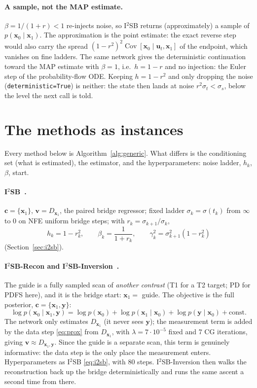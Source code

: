 \documentclass[11pt]{article}
\theoremstyle{remark}
\newcommand{\x}{\bm{x}}
\newcommand{\y}{\bm{y}}
\newcommand{\uu}{\bm{u}}
\newcommand{\vv}{\bm{v}}
\newcommand{\cc}{\bm{c}}
\newcommand{\code}[1]{\texttt{#1}}
\newcommand{\Dg}{D_{\x_1}}
\newcommand{\Dgy}{D_{\x_1,\y}}
\begin{document}
\paragraph{A sample, not the MAP estimate.} $\beta = 1/(1+r)<1$ re-injects noise, so I$^2$SB
returns (approximately) a sample of $p(\x_0\mid\x_1)$. The approximation is the point estimate:
the exact reverse step would also carry the spread
$(1-r^2)^2\operatorname{Cov}[\x_0\mid\uu_t,\x_1]$ of the endpoint, which vanishes on fine
ladders. The same network gives the deterministic continuation toward the MAP estimate with
$\beta = 1$, i.e.\ $h = 1-r$ and no injection: the Euler step of the probability-flow ODE.
Keeping $h = 1-r^2$ and only dropping the noise (\code{deterministic=True}) is neither: the
state then lands at noise $r^2\sigma_t < \sigma_s$, below the level the next call is told.

\section{The methods as instances}

Every method below is Algorithm~\ref{alg:generic}. What differs is the conditioning set (what
is estimated), the estimator, and the hyperparameters: noise ladder, $h_k$, $\beta$, start.

\paragraph{I$^2$SB~\cite{liu2023}.} $\cc = \{\x_1\}$, $\vv = \Dg$, the paired bridge regressor;
fixed ladder $\sigma_k = \sigma(t_k)$ from $\infty$ to $0$ on NFE uniform bridge steps; with
$r_k = \sigma_{k+1}/\sigma_k$,
\begin{equation}
  h_k = 1 - r_k^2,\qquad \beta_k = \frac{1}{1+r_k},\qquad \gamma_k^2 = \sigma_{k+1}^2(1-r_k^2)
  \label{eq:i2sb}
\end{equation}
(Section~\ref{sec:i2sb}).

\paragraph{I$^2$SB-Recon and I$^2$SB-Inversion~\cite{wang2024}.} The guide is a fully sampled
scan of \emph{another contrast} (T1 for a T2 target; PD for PDFS here), and it is the bridge
start: $\x_1 = $ guide. The objective is the full posterior, $\cc = \{\x_1,\y\}$:
\[
  \log p(\x_0\mid\x_1,\y) = \log p(\x_0) + \log p(\x_1\mid\x_0) + \log p(\y\mid\x_0)
  + \mathrm{const}.
\]
The network only estimates $\Dg$ (it never sees $\y$); the measurement term is added by the data
step \eqref{eq:prox} from $\Dg$, with $\lambda = 7\cdot10^{-5}$ fixed and 7 CG iterations,
giving $\vv\approx\Dgy$. Since the guide is a separate scan, this term is genuinely informative:
the data step is the only place the measurement enters. Hyperparameters as I$^2$SB
\eqref{eq:i2sb}, with 80 steps. I$^2$SB-Inversion then walks the reconstruction back up the
bridge deterministically and runs the same ascent a second time from there.
\end{document}
